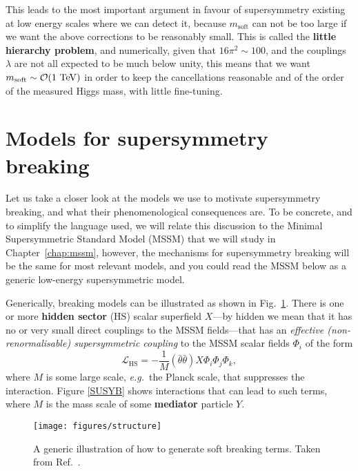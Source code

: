 \documentclass[notes.tex]{subfiles}
\begin{document}
This leads to  the most important argument in favour of supersymmetry existing at low energy scales where we can detect it, because $m_\text{soft}$ can not be too large if we want the above corrections to be reasonably small. This is called the {\bf little hierarchy problem}, and numerically, given that $16\pi^2\sim 100$, and the couplings $\lambda$ are not all expected to be much below unity,  this means that we want $m_\text{soft} \sim {\mathcal O}(1~{\rm TeV})$ in order to keep the cancellations reasonable and of the order of the measured Higgs mass, with little fine-tuning.


\section{Models for supersymmetry breaking} 
Let us take a closer look at the models we use to motivate supersymmetry breaking, and what their phenomenological consequences are. 
To be concrete, and to simplify the language used, we will relate this discussion to the Minimal Supersymmetric Standard Model (MSSM) that we will study in Chapter~\ref{chap:mssm}, however, the mechanisms for supersymmetry breaking will be the same for most relevant models, and you could read the MSSM below as a generic low-energy supersymmetric model.

Generically, breaking models can be illustrated as shown in Fig.~\ref{SSB}. There is one or more {\bf hidden sector} (HS) scalar superfield $X$---by hidden we mean that it has no or very small direct couplings to the  MSSM fields---that has an {\it effective (non-renormalisable) supersymmetric coupling} to the MSSM scalar fields $\Phi_i$ of the form
\begin{equation}
\mathcal{L}_\text{HS} = -\frac{1}{M}(\bar\theta\bar\theta)X\Phi_i\Phi_j\Phi_k,
\label{eq:HS_MSSM}
\end{equation}
where $M$ is some large scale, {\it e.g.}\ the Planck scale, that suppresses the interaction. Figure \ref{SUSYB} shows interactions that can lead to such terms, where $M$ is the mass scale of some {\bf mediator} particle $Y$. 

\begin{figure}[h!]
\centering
\texttt{[image: figures/structure]} 
\caption{A generic illustration of how to generate soft breaking terms. Taken from Ref.~\cite{Martin:1997ns}. \label{SSB}}
\end{figure}
\end{document}
